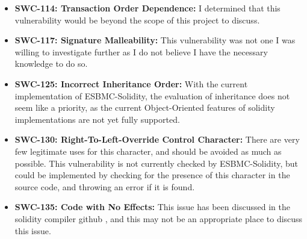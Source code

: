 \begin{itemize}
    \item \textbf{SWC-114: Transaction Order Dependence: }I determined that this vulnerability would be beyond the scope of this project to discuss.
    \item \textbf{SWC-117: Signature Malleability: } This vulnerability was not one I was willing to investigate further as I do not believe I have the necessary knowledge to do so.
    \item \textbf{SWC-125: Incorrect Inheritance Order: }With the current implementation of ESBMC-Solidity, the evaluation of inheritance does not seem like a priority, as the current Object-Oriented features of solidity implementations are not yet fully supported. 
    \item \textbf{SWC-130: Right-To-Left-Override Control Character: } There are very few legitimate uses for this character, and should be avoided as much as possible. This vulnerability is not currently checked by ESBMC-Solidity, but could be implemented by checking for the presence of this character in the source code, and throwing an error if it is found.
    \item \textbf{SWC-135: Code with No Effects: } This issue has been discussed in the solidity compiler github \cite{solidity_issue_7118}, and this may not be an appropriate place to discuss this issue.
\end{itemize}